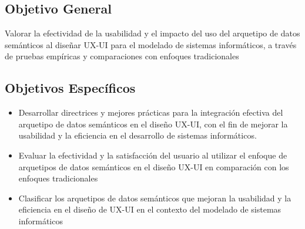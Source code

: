\documentclass[12pt,a4paper]{article}
\begin{document}
\subsection{Objetivo General}
\label{sec:9}
Valorar la efectividad de la usabilidad y el impacto del uso del arquetipo de datos semánticos al diseñar UX-UI para el modelado de sistemas informáticos, a través de pruebas empíricas y comparaciones con enfoques tradicionales 

\subsection{Objetivos Específicos}
\label{sec:10}
\begin{itemize}
  \item 
  Desarrollar directrices y mejores prácticas para la integración efectiva del arquetipo de datos semánticos en el diseño UX-UI, con el fin de mejorar la usabilidad y la eficiencia en el desarrollo de sistemas informáticos.
  \item 
  Evaluar la efectividad y la satisfacción del usuario al utilizar el enfoque de arquetipos de datos semánticos en el diseño UX-UI en comparación con los enfoques tradicionales
  \item 
  Clasificar los arquetipos de datos semánticos que mejoran la usabilidad y la eficiencia en el diseño de UX-UI en el contexto del modelado de sistemas informáticos
\end{itemize}


\end{document}
